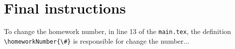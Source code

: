 \section{Final instructions}

To change the homework number, in line 13 of the \verb|main.tex|, the definition \verb|\homeworkNumber{\#}| is responsible for change the number...

